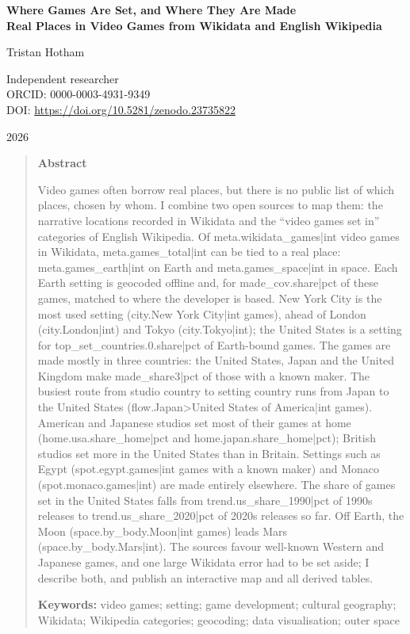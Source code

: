 \documentclass[11pt,a4paper]{article}
\begin{document}
\begin{center}
{\Large\bfseries Where Games Are Set, and Where They Are Made\\[2pt] Real Places in Video Games from Wikidata and English Wikipedia\par}
\vspace{1.2em}
{\large Tristan Hotham\par}
\vspace{0.3em}
{\small Independent researcher\\
ORCID: 0000-0003-4931-9349\\
DOI: \href{https://doi.org/10.5281/zenodo.23735822}{https://doi.org/10.5281/zenodo.23735822}\par}
\vspace{0.8em}
2026
\end{center}

\begin{quote}
\small
\begin{center}\textbf{Abstract}\end{center}
Video games often borrow real places, but there is no public list of which places, chosen by whom. I combine two open sources to map them: the narrative locations recorded in Wikidata and the ``video games set in'' categories of English Wikipedia. Of {{meta.wikidata_games|int}} video games in Wikidata, {{meta.games_total|int}} can be tied to a real place: {{meta.games_earth|int}} on Earth and {{meta.games_space|int}} in space. Each Earth setting is geocoded offline and, for {{made_cov.share|pct}} of these games, matched to where the developer is based. New York City is the most used setting ({{city.New York City|int}} games), ahead of London ({{city.London|int}}) and Tokyo ({{city.Tokyo|int}}); the United States is a setting for {{top_set_countries.0.share|pct}} of Earth-bound games. The games are made mostly in three countries: the United States, Japan and the United Kingdom make {{made_share3|pct}} of those with a known maker. The busiest route from studio country to setting country runs from Japan to the United States ({{flow.Japan>United States of America|int}} games). American and Japanese studios set most of their games at home ({{home.usa.share_home|pct}} and {{home.japan.share_home|pct}}); British studios set more in the United States than in Britain. Settings such as Egypt ({{spot.egypt.games|int}} games with a known maker) and Monaco ({{spot.monaco.games|int}}) are made entirely elsewhere. The share of games set in the United States falls from {{trend.us_share_1990|pct}} of 1990s releases to {{trend.us_share_2020|pct}} of 2020s releases so far. Off Earth, the Moon ({{space.by_body.Moon|int}} games) leads Mars ({{space.by_body.Mars|int}}). The sources favour well-known Western and Japanese games, and one large Wikidata error had to be set aside; I describe both, and publish an interactive map and all derived tables.

\textbf{Keywords:} video games; setting; game development; cultural geography; Wikidata; Wikipedia categories; geocoding; data visualisation; outer space
\end{quote}
\end{document}
